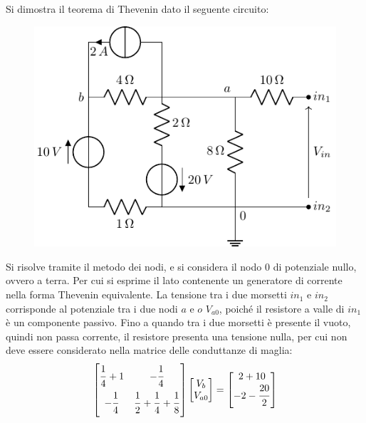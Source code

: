 \documentclass{article}
\numberwithin{equation}{subsection}
\begin{document}
Si dimostra il teorema di Thevenin dato il seguente circuito:
\begin{figure}[H]%
    \centering
    \includegraphics{circuito-8.pdf}
    \label{fig:circuito-8}
\end{figure}
Si risolve tramite il metodo dei nodi, e si considera il nodo $0$ di potenziale nullo, ovvero a terra. Per cui si esprime il lato contenente un generatore di corrente nella 
forma Thevenin equivalente. 
La tensione tra i due morsetti $in_1$ e $in_2$ corrisponde al potenziale tra i due nodi $a$ e $o$ $V_{a0}$, poiché il resistore a valle di $in_1$ è un componente passivo. 
Fino a quando tra i due morsetti è presente il vuoto, quindi non passa corrente, il resistore presenta una tensione nulla, per cui non deve essere considerato nella matrice 
delle conduttanze di maglia:  
\begin{gather*}
    \begin{bmatrix}
        \displaystyle\frac{\strut 1}{\strut 4}+1&-\displaystyle\frac{\strut 1}{\strut 4}\\
        \displaystyle-\frac{\strut 1}{\strut 4}&\displaystyle\frac{\strut 1}{\strut 2}+\frac{\strut 1}{\strut 4}+\frac{\strut 1}{\strut 8}
    \end{bmatrix}\begin{bmatrix}
        V_b\\
        V_{a0}
    \end{bmatrix}=\begin{bmatrix}
        2+10\\
        -2-\displaystyle\frac{\strut 20}{\strut 2}
    \end{bmatrix}
\end{gather*}
\end{document}
